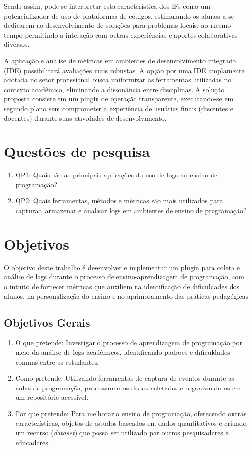 Sendo assim, pode-se interpretar esta característica dos IFs como um potencializador do uso de plataformas de 
códigos, estimulando os alunos a se dedicarem ao desenvolvimento de soluções para problemas locais, ao 
mesmo tempo permitindo a interação com outras experiências e aportes colaborativos diversos.

A aplicação e 
 análise de métricas em ambientes de desenvolvimento integrado (IDE) possibilitará avaliações mais robustas. A 
opção por uma IDE amplamente adotada no setor profissional busca uniformizar as ferramentas utilizadas no contexto acadêmico, eliminando a dissonância entre disciplinas. A solução proposta consiste em um plugin de 
operação transparente, executando-se em segundo plano sem comprometer a experiência de usuários finais 
(discentes e docentes) durante suas atividades de desenvolvimento.

\section{Questões de pesquisa}\label{sec:questoes-de-pesquisas}
\begin{enumerate}
    \item QP1: Quais são as principais aplicações do uso de logs no ensino de programação?
    \item QP2: Quais ferramentas, métodos e métricas são mais utilizados para capturar, armazenar e analisar logs em ambientes de ensino de programação?
\end{enumerate}
\section{Objetivos} \label{sec:objetivos}

O objetivo deste trabalho é desenvolver e implementar um plugin para coleta e análise de logs 
durante o processo de ensino-aprendizagem de programação, com o intuito de fornecer métricas que 
auxiliem na identificação de dificuldades dos alunos, na personalização do ensino e no 
aprimoramento das práticas pedagógicas

\subsection{Objetivos Gerais} \label{subsec:objetivos-gerais}
\begin{enumerate}
	\item O que pretende: Investigar o processo de aprendizagem de programação por meio da análise de logs acadêmicos, identificando padrões e dificuldades comuns entre os estudantes.
	\item Como pretende: Utilizando ferramentas de captura de eventos durante as aulas de programação, processando os dados coletados e organizando-os em um repositório acessível.
	\item Por que pretende: Para melhorar o ensino de programação, oferecendo outras características, objetos de estudos baseados em dados quantitativos e criando um recurso (\textit{dataset}) que possa ser utilizado por outros pesquisadores e educadores.
\end{enumerate}

